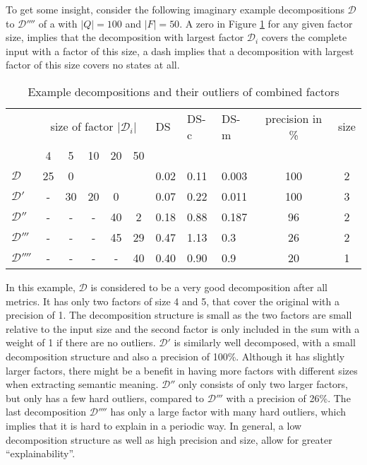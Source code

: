 To get some insight, consider the following imaginary example decompositions $\mathcal{D}$ to $\mathcal{D}''''$ of a \DFA with $|Q| = 100$ and $|F| = 50$.
A zero in Figure \ref{tab:metric-example-decompositions} for any given factor size, implies that the decomposition with largest factor $\mathcal{D}_i$ covers the complete input \DFA with a factor of this size, a dash implies that a decomposition with largest factor of this size covers no states at all.
\begin{table}[h]
	\centering
	\begin{tabular}{l|ccccc|lllcc}
		& \multicolumn{5}{c}{size of factor $|\mathcal{D}_i|$} & DS & DS-c & DS-m & precision in \% & size \\
		& 4 & 5 & 10 & 20 & 50 & & & & & \\
		\hline
		$\mathcal{D}$ & 25 & 0 & &  & & 0.02 & 0.11 & 0.003 & 100 & 2\\		
		$\mathcal{D}'$ & - & 30 & 20 & 0 & & 0.07 & 0.22& 0.011 & 100 & 3\\
		$\mathcal{D}''$ & - & - & - & 40 & 2 & 0.18 & 0.88 & 0.187 &  96 & 2\\
		$\mathcal{D}'''$ & - & - & - & 45 & 29 & 0.47 & 1.13 & 0.3 & 26 & 2\\
		$\mathcal{D}''''$ & - & - & - & - & 40 & 0.40 & 0.90 & 0.9 & 20 & 1\\
	\end{tabular}
	\caption{Example decompositions and their outliers of combined factors}
	\label{tab:metric-example-decompositions}
\end{table}
In this example, $\mathcal{D}$ is considered to be a very good decomposition after all metrics. It has only two factors of size 4 and 5, that cover the original \DFA with a precision of 1.
The decomposition structure is small as the two factors are small relative to the input size and the second factor is only included in the sum with a weight of 1 if there are no outliers.
$\mathcal{D}'$ is similarly well decomposed, with a small decomposition structure and also a precision of 100\%.
Although it has slightly larger factors, there might be a benefit in having more factors with different sizes when extracting semantic meaning.
$\mathcal{D}''$ only consists of only two larger factors, but only has a few hard outliers, compared to $\mathcal{D}'''$ with a precision of 26\%.
The last decomposition $\mathcal{D}''''$ has only a large factor with many hard outliers, which implies that it is hard to explain in a periodic way.
In general, a low decomposition structure as well as high precision and size, allow for greater \enquote{explainability}.


